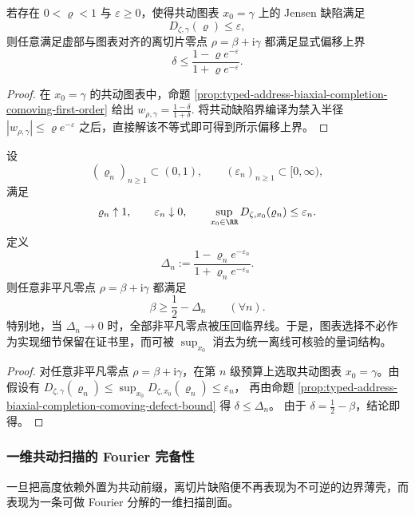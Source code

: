 \begin{proposition}[共动缺陷界导出无高度偏移界]\label{prop:typed-address-biaxial-completion-comoving-defect-bound}
若存在 \(0<\varrho<1\) 与 \(\varepsilon\ge 0\)，使得共动图表 \(x_0=\gamma\) 上的 Jensen 缺陷满足
\[
D_{\zeta,\gamma}(\varrho)\le \varepsilon,
\]
则任意满足虚部与图表对齐的离切片零点 \(\rho=\beta+\mathrm{i}\gamma\) 都满足显式偏移上界
\[
\delta\le
\frac{1-\varrho e^{-\varepsilon}}{1+\varrho e^{-\varepsilon}}.
\]
\end{proposition}
\begin{proof}
在 \(x_0=\gamma\) 的共动图表中，命题 \ref{prop:typed-address-biaxial-completion-comoving-first-order} 给出
\(
w_{\rho,\gamma}=\frac{1-\delta}{1+\delta}.
\)
将共动缺陷界编译为禁入半径
\(
|w_{\rho,\gamma}|\le \varrho e^{-\varepsilon}
\)
之后，直接解该不等式即可得到所示偏移上界。
\end{proof}

\begin{theorem}\label{thm:typed-address-biaxial-completion-comoving-uniform-minimization}
设
\[
(\varrho_n)_{n\ge 1}\subset(0,1),
\qquad
(\varepsilon_n)_{n\ge 1}\subset[0,\infty),
\]
满足
\[
\varrho_n\uparrow 1,
\qquad
\varepsilon_n\downarrow 0,
\qquad
\sup_{x_0\in\RR}D_{\zeta,x_0}(\varrho_n)\le \varepsilon_n.
\]
定义
\[
\Delta_n:=
\frac{1-\varrho_n e^{-\varepsilon_n}}{1+\varrho_n e^{-\varepsilon_n}}.
\]
则任意非平凡零点 \(\rho=\beta+\mathrm{i}\gamma\) 都满足
\[
\beta\ge \frac12-\Delta_n
\qquad(\forall n).
\]
特别地，当 \(\Delta_n\to 0\) 时，全部非平凡零点被压回临界线。于是，图表选择不必作为实现细节保留在证书里，而可被 \(\sup_{x_0}\) 消去为统一离线可核验的量词结构。
\end{theorem}
\begin{proof}
对任意非平凡零点 \(\rho=\beta+\mathrm{i}\gamma\)，在第 \(n\) 级预算上选取共动图表 \(x_0=\gamma\)。由假设有
\(
D_{\zeta,\gamma}(\varrho_n)\le \sup_{x_0}D_{\zeta,x_0}(\varrho_n)\le \varepsilon_n
\)，
再由命题 \ref{prop:typed-address-biaxial-completion-comoving-defect-bound} 得
\(
\delta\le \Delta_n
\)。
由于 \(\delta=\frac12-\beta\)，结论即得。
\end{proof}

\subsubsection{一维共动扫描的 Fourier 完备性}\label{subsubsec:typed-address-biaxial-completion-comoving-fourier}
一旦把高度依赖外置为共动前缀，离切片缺陷便不再表现为不可逆的边界薄壳，而表现为一条可做 Fourier 分解的一维扫描剖面。

